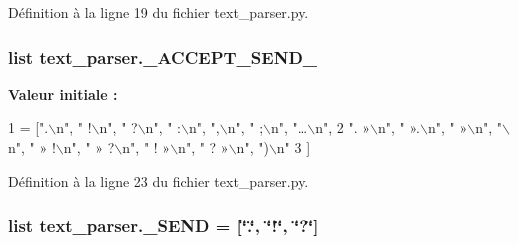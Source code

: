 Définition à la ligne 19 du fichier text\+\_\+parser.\+py.

\hypertarget{namespacetext__parser_ad4d4f9ba4881bef4ad7e51c2e1f32bf3}{}
\subsubsection[{\+\_\+\+A\+C\+C\+E\+P\+T\+\_\+\+S\+E\+N\+D\+\_\+2}]{\setlength{\rightskip}{0pt plus 5cm}list text\+\_\+parser.\+\_\+\+A\+C\+C\+E\+P\+T\+\_\+\+S\+E\+N\+D\+\_}\label{namespacetext__parser_ad4d4f9ba4881bef4ad7e51c2e1f32bf3}
{\bfseries Valeur initiale \+:}
\begin{DoxyCode}
1 = [\textcolor{stringliteral}{".\(\backslash\)n"}, \textcolor{stringliteral}{" !\(\backslash\)n"}, \textcolor{stringliteral}{" ?\(\backslash\)n"}, \textcolor{stringliteral}{" :\(\backslash\)n"}, \textcolor{stringliteral}{",\(\backslash\)n"}, \textcolor{stringliteral}{" ;\(\backslash\)n"}, \textcolor{stringliteral}{"…\(\backslash\)n"},
2 \textcolor{stringliteral}{". »\(\backslash\)n"}, \textcolor{stringliteral}{" ».\(\backslash\)n"}, \textcolor{stringliteral}{" »\(\backslash\)n"}, \textcolor{stringliteral}{"\(\backslash\)n"}, \textcolor{stringliteral}{" » !\(\backslash\)n"}, \textcolor{stringliteral}{" » ?\(\backslash\)n"}, \textcolor{stringliteral}{" ! »\(\backslash\)n"}, \textcolor{stringliteral}{" ? »\(\backslash\)n"}, \textcolor{stringliteral}{")\(\backslash\)n"}
3 ]
\end{DoxyCode}


Définition à la ligne 23 du fichier text\+\_\+parser.\+py.

\hypertarget{namespacetext__parser_a5c9971c0d0769dd5cd6dc94b2f12af95}{}
\subsubsection[{\+\_\+\+S\+E\+N\+D}]{\setlength{\rightskip}{0pt plus 5cm}list text\+\_\+parser.\+\_\+\+S\+E\+N\+D = \mbox{[}\char`\"{}.\char`\"{}, \char`\"{}!\char`\"{}, \char`\"{}?\char`\"{}\mbox{]}}\label{namespacetext__parser_a5c9971c0d0769dd5cd6dc94b2f12af95}


